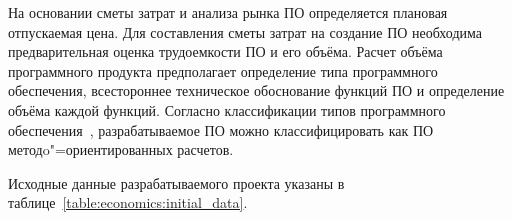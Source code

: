 \def \additionalSalaryRate{20}

\def \socialProtectionRate{34.6}

\def \otherExpenseRate{20}

\def \overheadExpenseRate{100}

\def \profitability{35}

\def \vatRate{20}

\def \profitTaxRate{18}

\def \materialsRate{3}

\def \debugRate{15} %

\def \machineHourCost{2.5}

\def \supportAndAdaptationRate{30}

На основании сметы затрат и анализа рынка ПО определяется плановая отпускаемая цена.
Для составления сметы затрат на создание ПО необходима предварительная оценка трудоемкости ПО и его объёма.
Расчет объёма программного продукта предполагает определение типа программного обеспечения, всестороннее техническое обоснование функций ПО и определение объёма каждой функций.
Согласно классификации типов программного обеспечения~\cite[с.~59,~приложение 1]{palicyn_2006}, разрабатываемое ПО можно классифицировать как ПО методo"=ориентированных расчетов.

Исходные данные разрабатываемого проекта указаны в таблице~\ref{table:economics:initial_data}.

